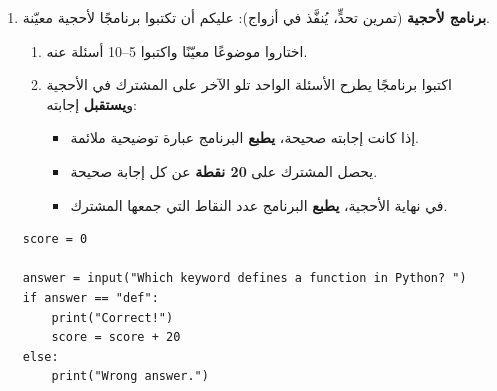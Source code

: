 \documentclass[14pt]{extarticle}
\begin{document}
\begin{enumerate}[resume, label=\textbf{تمرين \arabic*:}, wide=0pt, itemsep=2.2em]
\begin{boxCode}
\begin{english}
\begin{verbatim}
ex7()
\end{verbatim}
\end{english}
\end{boxCode}

اكتبوا العملية من جديد بحيث تؤدي نفس الغرض ولكن بواسطة \textbf{الشرط المتداخل}.

\ifwithsols
\begin{boxSolution}
\begin{english}
\begin{verbatim}
def ex7():
    a = int(input("Enter first number: "))
    b = int(input("Enter second number: "))
    if a > b:
        if a < 20:
            print("True")
        else:
            print("False")
    else:
        print("False")

ex7()
\end{verbatim}
\end{english}
\end{boxSolution}

\fi
\filbreak

\item \textbf{برنامج لأحجية} (تمرين تحدٍّ، يُنفَّذ في أزواج): عليكم أن تكتبوا برنامجًا لأحجية معيّنة.

\begin{enumerate}[label=\arabic*., leftmargin=*, itemsep=0.5em]
\item اختاروا موضوعًا معيّنًا واكتبوا 5--10 أسئلة عنه.
\item اكتبوا برنامجًا يطرح الأسئلة الواحد تلو الآخر على المشترك في الأحجية و\textbf{يستقبل} إجابته:
\begin{itemize}[itemsep=0.3em]
\item إذا كانت إجابته صحيحة، \textbf{يطبع} البرنامج عبارة توضيحية ملائمة.
\item يحصل المشترك على \textbf{20 نقطة} عن كل إجابة صحيحة.
\item في نهاية الأحجية، \textbf{يطبع} البرنامج عدد النقاط التي جمعها المشترك.
\end{itemize}
\end{enumerate}

\ifwithsols
\begin{boxSolution}
\begin{english}
\begin{verbatim}
score = 0

answer = input("Which keyword defines a function in Python? ")
if answer == "def":
    print("Correct!")
    score = score + 20
else:
    print("Wrong answer.")


\end{verbatim}
\end{english}
\end{boxSolution}
\end{enumerate}
\end{document}
